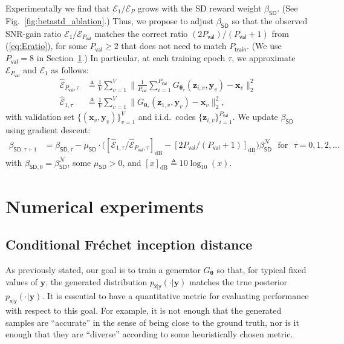 \documentclass{article}
\theoremstyle{plain}
\theoremstyle{definition}
\theoremstyle{remark}
\renewcommand{\hat}{\widehat}
\newcommand{\defn}{\triangleq}
\renewcommand{\vec}[1]{\ensuremath{\boldsymbol{#1}}}
\newcommand{\mc}[1]{\ensuremath{\mathcal{#1}}}
\renewcommand{\eqref}[1]{(\ref{eq:#1})}
\newcommand{\figref}[1]{Fig.~\ref{fig:#1}}
\newcommand{\secref}[1]{Section~\ref{sec:#1}}
\newcommand{\pxgy}{p_{\mathsf{x}|\mathsf{y}}}
\newcommand{\pxhgy}{p_{\hat{\mathsf{x}}|\mathsf{y}}}
\newcommand{\train}{_{\mathsf{train}}}
\newcommand{\val}{_{\mathsf{val}}}
\newcommand{\betastd}{\beta_{\mathsf{SD}}}
\newcommand{\betastdG}{\beta_{\mathsf{SD}}^\mc{N}}
\newcommand{\mustd}{\mu_{\mathsf{SD}}}
\begin{document}
Experimentally we find that $\mc{E}_1/\mc{E}_P$ grows with the SD reward weight $\betastd$.
(See \figref{betastd_ablation}.)
Thus, we propose to adjust $\betastd$ so that the observed SNR-gain ratio $\mc{E}_1/\mc{E}_{P\val}$ matches the correct ratio $(2P\val)/(P\val+1)$ from \eqref{Eratio}, for some $P\val\geq 2$ that does not need to match $P\train$.
(We use $P\val=8$ in \secref{experiments}.)
In particular, at each training epoch $\tau$, we approximate $\mc{E}_{P\val}$ and $\mc{E}_1$ 
as follows:
\begin{align}
\hat{\mc{E}}_{P\val,\tau} 
&\defn \textstyle \frac{1}{V}\sum_{v=1}^V \|\frac{1}{P\val}\sum_{i=1}^{P\val} G_{\vec{\theta}_\tau}(\vec{z}_{i,v},\vec{y}_v)-\vec{x}_v\|_2^2 \\
\hat{\mc{E}}_{1,\tau} 
&\defn \textstyle \frac{1}{V}\sum_{v=1}^V \|G_{\vec{\theta}_\tau}(\vec{z}_{1,v},\vec{y}_v)-\vec{x}_v\|_2^2 ,
\end{align}
with validation set $\{(\vec{x}_v,\vec{y}_v)\}_{v=1}^V$ and 
i.i.d.\ codes $\{\vec{z}_{i,v}\}_{i=1}^{P\val}$.
We update $\betastd$ using gradient descent:
\begin{align}
\beta_{\mathsf{SD},\tau+1}
&= \textstyle \beta_{\mathsf{SD},\tau} - \mustd \cdot \big( 
[\hat{\mc{E}}_{1,\tau}/\hat{\mc{E}}_{P\val,\tau}]_{\text{dB}} 
- [2P\val/(P\val+1)]_{\text{dB}} 
\big) \betastdG
\text{~~for~~}\tau=0,1,2,\dots
\label{eq:betastd}
\end{align}
with 
$\beta_{\mathsf{SD},0} = \betastdG$,
some $\mustd>0$, 
and $[x]_{\text{dB}}\defn 10\log_{10}(x)$.

\section{Numerical experiments} \label{sec:experiments}

\subsection{Conditional Fr\'echet inception distance} \label{sec:cfid}

As previously stated, our goal is to train a generator $G_{\vec{\theta}}$ so that, for typical fixed values of $\vec{y}$, the generated distribution $\pxhgy(\cdot|\vec{y})$ matches the true posterior $\pxgy(\cdot|\vec{y})$.
It is essential to have a quantitative metric for evaluating performance with respect to this goal.
For example, it is not enough that the generated samples are ``accurate'' in the sense of being close to the ground truth, nor is it enough that they are ``diverse'' according to some heuristically chosen metric.
\end{document}
